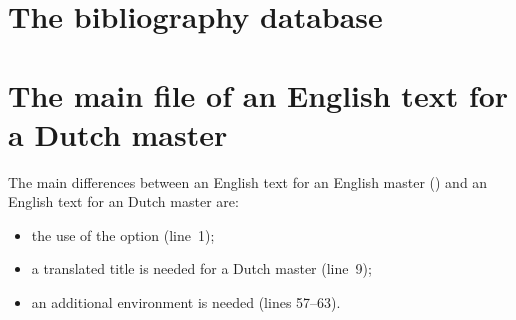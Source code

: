 \section{The bibliography database}
\label{sec:file:bib}

\section{The main file of an English text for a Dutch master}
\label{sec:file:hoofd}

The main differences between an English text for an English master
() and an English text for an Dutch master are:
\begin{itemize}
\item the use of the  option (line~1);
\item a translated title is needed for a Dutch master (line~9);
\item an additional  environment is needed (lines 57--63).
\end{itemize}
\medskip


